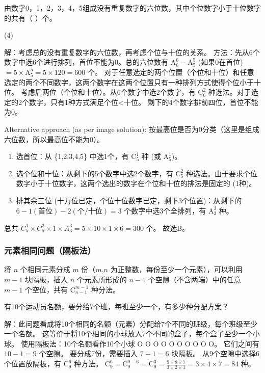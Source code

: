 \begin{example}
    由数字0，1，2，3，4，5组成没有重复数字的六位数，其中个位数字小于十位数字的共有（ ）个。
    \begin{tasks}(4)
    \end{tasks}
\end{example}
\begin{solution}
    解：考虑总的没有重复数字的六位数，再考虑个位与十位的关系。
    方法：先从6个数字中选6个进行排列，首位不能为0。总的六位数有 $\mathrm{A}_{6}^{6} - \mathrm{A}_{5}^{5}$ (如果0在首位) $= 5 \times \mathrm{A}_{5}^{5} = 5 \times 120 = 600$ 个。
    对于任意选定的两个位置（个位和十位）和任意选定的两个不同数字，这两个数字在这两个位置只有一种排列方式使得个位小于十位。
    考虑后两位（个位和十位）。从6个数字中选2个数字，有 $\mathrm{C}_{6}^{2}$ 种选法。对于选定的2个数字，只有1种方式满足个位<十位。
    剩下的4个数字排前四位，首位不能为0。

    Alternative approach (as per image solution):
    按最高位是否为0分类（这里是组成六位数，所以最高位不能为0）。
    \begin{enumerate}
        \item 选首位：从 \{1,2,3,4,5\} 中选1个，有 $\mathrm{C}_{5}^{1}$ 种 (或 $\mathrm{A}_{5}^{1}$)。
        \item 选个位和十位：从剩下的5个数字中选2个数字，有 $\mathrm{C}_{5}^{2}$ 种选法。由于要求个位数字小于十位数字，这两个选出的数字在个位和十位的排法是固定的 (1种)。
        \item 排其余三位 (十万位已定，个位十位数字已定，剩下3个位置)：从剩下的 $6-1(\text{首位})-2(\text{个/十位})=3$ 个数字中选3个全排列，有 $\mathrm{A}_{3}^{3}$ 种。
    \end{enumerate}
    总共 $C_{5}^{1} \times C_{5}^{2} \times 1 \times A_{3}^{3} = 5 \times 10 \times 1 \times 6 = 300$ 个。
    故选B。
\end{solution}

\subsubsection{元素相同问题（隔板法）}
将 $n$ 个相同元素分成 $m$ 份（$m$,$n$ 为正整数，每份至少一个元素），可以利用 $m-1$ 块隔板，插入 $n$ 个元素所形成的 $n-1$ 个空隙（不含两端）中的任意 $m-1$ 个空位，共有 $\mathrm{C}_{n-1}^{m-1}$ 种分法。

\begin{example}
    有10个运动员名额，要分给7个班，每班至少一个，有多少种分配方案？
\end{example}
\begin{solution}
    解：此问题看成将10个相同的名额（元素）分配给7个不同的班级，每个班级至少一个名额。
    这等价于将10个相同的小球放入7个不同的盒子，每个盒子至少一个小球。
    使用隔板法：10个名额看作10个小球 O O O O O O O O O O。
    它们之间有 $10-1=9$ 个空隙。
    要分成7份，需要插入 $7-1=6$ 块隔板。
    从9个空隙中选择6个位置放隔板，有 $\mathrm{C}_{9}^{6}$ 种方法。
    $\mathrm{C}_{9}^{6} = \mathrm{C}_{9}^{9-6} = \mathrm{C}_{9}^{3} = \frac{9 \times 8 \times 7}{3 \times 2 \times 1} = 3 \times 4 \times 7 = 84$ 种。
\end{solution}

